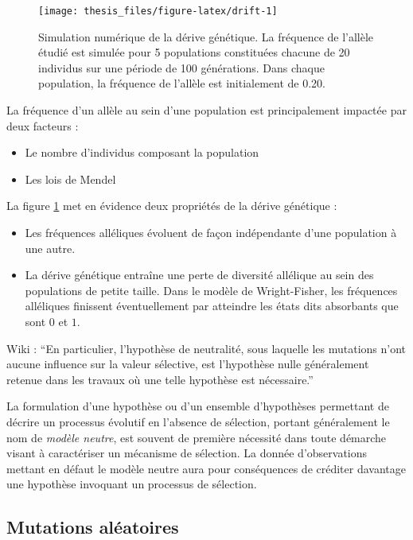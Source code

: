 \documentclass[12pt,twoside]{ugathesis}
\begin{document}
\begin{figure}

{\centering \texttt{[image: thesis\_files/figure-latex/drift-1]} 

}

\caption{Simulation numérique de la dérive génétique. La
fréquence de l'allèle étudié est simulée pour 5 populations constituées
chacune de 20 individus sur une période de 100 générations. Dans chaque
population, la fréquence de l'allèle est initialement de 0.20.}\label{fig:drift}
\end{figure}
La fréquence d'un allèle au sein d'une population est principalement
impactée par deux facteurs :
\begin{itemize}
\item
  Le nombre d'individus composant la population
\item
  Les lois de Mendel
\end{itemize}
La figure \ref{fig:drift} met en évidence deux propriétés de la dérive
génétique :
\begin{itemize}
\item
  Les fréquences alléliques évoluent de façon indépendante d'une
  population à une autre.
\item
  La dérive génétique entraîne une perte de diversité allélique au sein
  des populations de petite taille. Dans le modèle de Wright-Fisher, les
  fréquences alléliques finissent éventuellement par atteindre les états
  dits absorbants que sont \(0\) et \(1\).
\end{itemize}
Wiki : ``En particulier, l'hypothèse de neutralité, sous laquelle les
mutations n'ont aucune influence sur la valeur sélective, est
l'hypothèse nulle généralement retenue dans les travaux où une telle
hypothèse est nécessaire.''

La formulation d'une hypothèse ou d'un ensemble d'hypothèses permettant
de décrire un processus évolutif en l'absence de sélection, portant
généralement le nom de \emph{modèle neutre}, est souvent de première
nécessité dans toute démarche visant à caractériser un mécanisme de
sélection. La donnée d'observations mettant en défaut le modèle neutre
aura pour conséquences de créditer davantage une hypothèse invoquant un
processus de sélection.

\subsection{Mutations aléatoires}\label{mutations-aleatoires}
\end{document}
